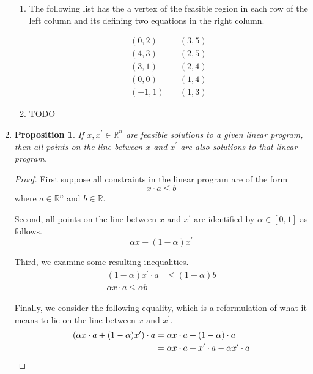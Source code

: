 \documentclass[letterpaper,11pt]{article}
\newtheorem{proposition}{Proposition}
\newcommand{\R}{\mathbb{R}}
\begin{document}
\begin{enumerate}
\begin{enumerate}
            \item The following list has the a vertex of the feasible region in
                each row of the left column and its defining two equations in
                the right column.

                \begin{align*}
                    (0, 2)  &\quad (3, 5) \\
                    (4, 3)  &\quad (2, 5) \\
                    (3, 1)  &\quad (2, 4) \\
                    (0, 0)  &\quad (1, 4) \\
                    (-1, 1) &\quad (1, 3)
                \end{align*}

            \item TODO

        \end{enumerate}

    \item

        \begin{proposition}
            If $x,x^\prime \in \R^n$ are feasible solutions to a given linear
            program, then all points on the line between $x$ and $x^\prime$ are
            also solutions to that linear program.
        \end{proposition}

        \begin{proof}
            First suppose all constraints in the linear program are of the form
            $$
            x \cdot a \leq b
            $$
            where $a \in \R^n$ and $b \in \R$.

            Second, all points on the line between $x$ and $x^\prime$ are identified by
            $\alpha \in [0,1]$ as follows.
            $$
            \alpha x + (1-\alpha)x^\prime
            $$

            Third, we examine some resulting inequalities.
            \begin{align}
                (1 - \alpha)x^\prime \cdot a & \leq (1 - \alpha) b \label{ineq:oneminusalphax} \\
                \alpha x \cdot a \leq \alpha b \label{ineq:alphax}
            \end{align}

            Finally, we consider the following equality, which is a
            reformulation of what it means to lie on the line between $x$ and
            $x^\prime$.
            \begin{align}
                (\alpha x \cdot a + (1 - \alpha) x^\prime) \cdot a
                &= \alpha x \cdot a + (1 - \alpha) \cdot a \notag \\
                &= \alpha x \cdot a + x^\prime \cdot a - \alpha x^\prime \cdot a \label{eq:qed}
            \end{align}


\end{proof}
\end{enumerate}
\end{document}
